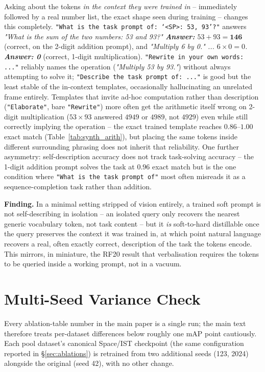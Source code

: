 \documentclass{article}
\newenvironment{finding}
  {\par\smallskip\noindent\begin{lrbox}{\findingbox}%
   \begin{minipage}{\dimexpr\linewidth-2\fboxsep-2\fboxrule\relax}\small}
  {\end{minipage}\end{lrbox}%
   \setlength{\fboxrule}{0.9pt}%
   \noindent\fcolorbox{findingframe}{findingback}{\usebox{\findingbox}}\par\smallskip}
\begin{document}
Asking about the tokens \emph{in the context they were trained in} -- immediately followed by a real number list, the exact shape seen during training -- changes this completely.
\texttt{"What is the task prompt of: `<SP>: 53, 93'?"} answers \emph{"What is the sum of the two numbers: 53 and 93?" \textbf{Answer:} $53+93=\mathbf{146}$} (correct, on the 2-digit addition prompt), and \emph{"Multiply 6 by 0." ... $6\times0=0$. \textbf{Answer: 0}} (correct, 1-digit multiplication).
\texttt{"Rewrite in your own words: ..."} reliably names the operation (\emph{"Multiply 53 by 93."}) without always attempting to solve it; \texttt{"Describe the task prompt of: ..."} is good but the least stable of the in-context templates, occasionally hallucinating an unrelated frame entirely.
Templates that invite ad-hoc computation rather than description (\texttt{"Elaborate"}, bare \texttt{"Rewrite"}) more often get the arithmetic itself wrong on 2-digit multiplication ($53\times93$ answered $4949$ or $4989$, not $4929$) even while still correctly implying the operation -- the exact trained template reaches $0.86$--$1.00$ exact match (Table~\ref{tab:synth_arith}), but placing the same tokens inside different surrounding phrasing does not inherit that reliability.
One further asymmetry: self-description accuracy does not track task-solving accuracy -- the 1-digit addition prompt solves the task at $0.96$ exact match but is the one condition where \texttt{"What is the task prompt of"} most often misreads it as a sequence-completion task rather than addition.

\begin{finding} \textbf{Finding.} In a minimal setting stripped of vision entirely, a trained soft prompt is not self-describing in isolation -- an isolated query only recovers the nearest generic vocabulary token, not task content -- but it \emph{is} soft-to-hard distillable once the query preserves the context it was trained in, at which point natural language recovers a real, often exactly correct, description of the task the tokens encode. This mirrors, in miniature, the RF20 result that verbalisation requires the tokens to be queried inside a working prompt, not in a vacuum.
\end{finding}

\section{Multi-Seed Variance Check}
\label{app:seed_variance}

Every ablation-table number in the main paper is a single run; the main text
therefore treats per-dataset differences below roughly one mAP point
cautiously. Each pool dataset's canonical Space/IST checkpoint (the same
configuration reported in \S\ref{sec:ablations}) is retrained from two
additional seeds (123, 2024) alongside the original (seed 42), with no other
change.
\end{document}
